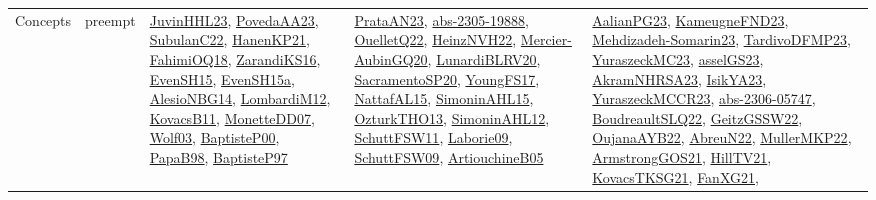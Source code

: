 {\begin{longtable}{llp{6cm}p{6cm}p{6cm}}
Concepts & preempt & \href{papers/JuvinHHL23.pdf}{JuvinHHL23}\cite{JuvinHHL23}, \href{papers/PovedaAA23.pdf}{PovedaAA23}\cite{PovedaAA23}, \href{articles/SubulanC22.pdf}{SubulanC22}\cite{SubulanC22}, \href{papers/HanenKP21.pdf}{HanenKP21}\cite{HanenKP21}, \href{articles/FahimiOQ18.pdf}{FahimiOQ18}\cite{FahimiOQ18}, \href{articles/ZarandiKS16.pdf}{ZarandiKS16}\cite{ZarandiKS16}, \href{papers/EvenSH15.pdf}{EvenSH15}\cite{EvenSH15}, \href{articles/EvenSH15a.pdf}{EvenSH15a}\cite{EvenSH15a}, \href{papers/AlesioNBG14.pdf}{AlesioNBG14}\cite{AlesioNBG14}, \href{articles/LombardiM12.pdf}{LombardiM12}\cite{LombardiM12}, \href{articles/KovacsB11.pdf}{KovacsB11}\cite{KovacsB11}, \href{papers/MonetteDD07.pdf}{MonetteDD07}\cite{MonetteDD07}, \href{papers/Wolf03.pdf}{Wolf03}\cite{Wolf03}, \href{articles/BaptisteP00.pdf}{BaptisteP00}\cite{BaptisteP00}, \href{articles/PapaB98.pdf}{PapaB98}\cite{PapaB98}, \href{papers/BaptisteP97.pdf}{BaptisteP97}\cite{BaptisteP97} & \href{articles/PrataAN23.pdf}{PrataAN23}\cite{PrataAN23}, \href{articles/abs-2305-19888.pdf}{abs-2305-19888}\cite{abs-2305-19888}, \href{papers/OuelletQ22.pdf}{OuelletQ22}\cite{OuelletQ22}, \href{articles/HeinzNVH22.pdf}{HeinzNVH22}\cite{HeinzNVH22}, \href{papers/Mercier-AubinGQ20.pdf}{Mercier-AubinGQ20}\cite{Mercier-AubinGQ20}, \href{articles/LunardiBLRV20.pdf}{LunardiBLRV20}\cite{LunardiBLRV20}, \href{articles/SacramentoSP20.pdf}{SacramentoSP20}\cite{SacramentoSP20}, \href{papers/YoungFS17.pdf}{YoungFS17}\cite{YoungFS17}, \href{articles/NattafAL15.pdf}{NattafAL15}\cite{NattafAL15}, \href{articles/SimoninAHL15.pdf}{SimoninAHL15}\cite{SimoninAHL15}, \href{articles/OzturkTHO13.pdf}{OzturkTHO13}\cite{OzturkTHO13}, \href{papers/SimoninAHL12.pdf}{SimoninAHL12}\cite{SimoninAHL12}, \href{articles/SchuttFSW11.pdf}{SchuttFSW11}\cite{SchuttFSW11}, \href{papers/Laborie09.pdf}{Laborie09}\cite{Laborie09}, \href{papers/SchuttFSW09.pdf}{SchuttFSW09}\cite{SchuttFSW09}, \href{papers/ArtiouchineB05.pdf}{ArtiouchineB05}\cite{ArtiouchineB05} & \href{papers/AalianPG23.pdf}{AalianPG23}\cite{AalianPG23}, \href{papers/KameugneFND23.pdf}{KameugneFND23}\cite{KameugneFND23}, \href{papers/Mehdizadeh-Somarin23.pdf}{Mehdizadeh-Somarin23}\cite{Mehdizadeh-Somarin23}, \href{papers/TardivoDFMP23.pdf}{TardivoDFMP23}\cite{TardivoDFMP23}, \href{papers/YuraszeckMC23.pdf}{YuraszeckMC23}\cite{YuraszeckMC23}, \href{papers/asselGS23.pdf}{asselGS23}\cite{asselGS23}, \href{articles/AkramNHRSA23.pdf}{AkramNHRSA23}\cite{AkramNHRSA23}, \href{articles/IsikYA23.pdf}{IsikYA23}\cite{IsikYA23}, \href{articles/YuraszeckMCCR23.pdf}{YuraszeckMCCR23}\cite{YuraszeckMCCR23}, \href{articles/abs-2306-05747.pdf}{abs-2306-05747}\cite{abs-2306-05747}, \href{papers/BoudreaultSLQ22.pdf}{BoudreaultSLQ22}\cite{BoudreaultSLQ22}, \href{papers/GeitzGSSW22.pdf}{GeitzGSSW22}\cite{GeitzGSSW22}, \href{papers/OujanaAYB22.pdf}{OujanaAYB22}\cite{OujanaAYB22}, \href{articles/AbreuN22.pdf}{AbreuN22}\cite{AbreuN22}, \href{articles/MullerMKP22.pdf}{MullerMKP22}\cite{MullerMKP22}, \href{papers/ArmstrongGOS21.pdf}{ArmstrongGOS21}\cite{ArmstrongGOS21}, \href{papers/HillTV21.pdf}{HillTV21}\cite{HillTV21}, \href{papers/KovacsTKSG21.pdf}{KovacsTKSG21}\cite{KovacsTKSG21}, \href{articles/FanXG21.pdf}{FanXG21}\cite{FanXG21}, 
\end{longtable}}
